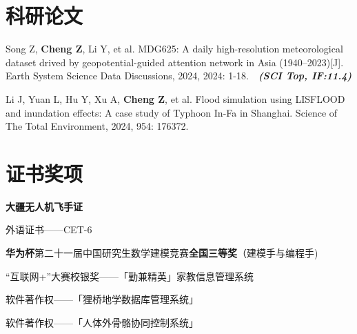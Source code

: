 \documentclass{resume}
\begin{document}
\section{科研论文}
\begin{itemize}[parsep=0.2ex]

\vspace{0.2cm}
  {\small
  \item Song Z, \textbf{Cheng Z}, Li Y, et al. MDG625: A daily high-resolution meteorological dataset drived by geopotential-guided attention network in Asia (1940–2023)[J]. Earth System Science Data Discussions, 2024, 2024: 1-18.~~\textbf{\textit{(SCI Top, IF:11.4)}}

\vspace{0.2cm}
  \item Li J, Yuan L, Hu Y, Xu A, \textbf{Cheng Z}, et al. Flood simulation using LISFLOOD and inundation effects: A case study of Typhoon In-Fa in Shanghai. Science of The Total Environment, 2024, 954: 176372.
        }
\end{itemize}

\vspace{0.1cm}
\section{证书奖项}
\begin{itemize}[parsep=0.2ex]
  {\small
  \item \textbf{大疆无人机飞手证}
  \item 外语证书——CET-6
  \item \textbf{华为杯}第二十一届中国研究生数学建模竞赛\textbf{全国三等奖}（建模手与编程手)
  \item “互联网+”大赛校银奖——「勤兼精英」家教信息管理系统
  \item 软件著作权——「狸桥地学数据库管理系统」
  \item 软件著作权——「人体外骨骼协同控制系统」 
  }
\end{itemize}

\end{document}
